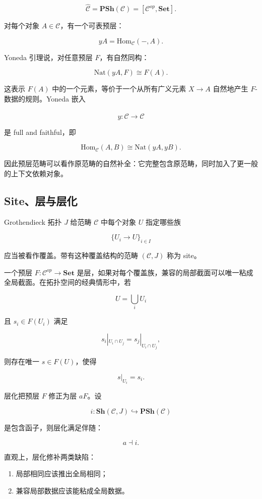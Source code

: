 \documentclass[UTF8,11pt,fontset=none]{ctexart}
\begin{document}
\[
\widehat{\mathcal{C}}
=\mathbf{PSh}(\mathcal{C})
=[\mathcal{C}^{op},\mathbf{Set}].
\]

对每个对象 \(A\in\mathcal{C}\)，有一个可表预层：


\[
yA=\mathrm{Hom}_{\mathcal{C}}(-,A).
\]

Yoneda 引理说，对任意预层 \(F\)，有自然同构：


\[
\mathrm{Nat}(yA,F)\cong F(A).
\]

这表示 \(F(A)\) 中的一个元素，等价于一个从所有广义元素 \(X\to A\) 自然地产生 \(F\)-数据的规则。Yoneda 嵌入


\[
y:\mathcal{C}\to\widehat{\mathcal{C}}
\]

是 full and faithful，即


\[
\mathrm{Hom}_{\mathcal{C}}(A,B)
\cong
\mathrm{Nat}(yA,yB).
\]

因此预层范畴可以看作原范畴的自然补全：它完整包含原范畴，同时加入了更一般的上下文依赖对象。


\subsection{Site、层与层化}

Grothendieck 拓扑 \(J\) 给范畴 \(\mathcal{C}\) 中每个对象 \(U\) 指定哪些族


\[
\{U_i\to U\}_{i\in I}
\]

应当被看作覆盖。带有这种覆盖结构的范畴 \((\mathcal{C},J)\) 称为 site。


一个预层 \(F:\mathcal{C}^{op}\to\mathbf{Set}\) 是层，如果对每个覆盖族，兼容的局部截面可以唯一粘成全局截面。在拓扑空间的经典情形中，若


\[
U=\bigcup_i U_i
\]

且 \(s_i\in F(U_i)\) 满足


\[
s_i|_{U_i\cap U_j}=s_j|_{U_i\cap U_j},
\]

则存在唯一 \(s\in F(U)\)，使得


\[
s|_{U_i}=s_i.
\]

层化把预层 \(F\) 修正为层 \(aF\)。设


\[
i:\mathbf{Sh}(\mathcal{C},J)\hookrightarrow \mathbf{PSh}(\mathcal{C})
\]

是包含函子，则层化满足伴随：


\[
a\dashv i.
\]

直观上，层化修补两类缺陷：


\begin{enumerate}
\item 局部相同应该推出全局相同；
\item 兼容局部数据应该能粘成全局数据。
\end{enumerate}
\end{document}
